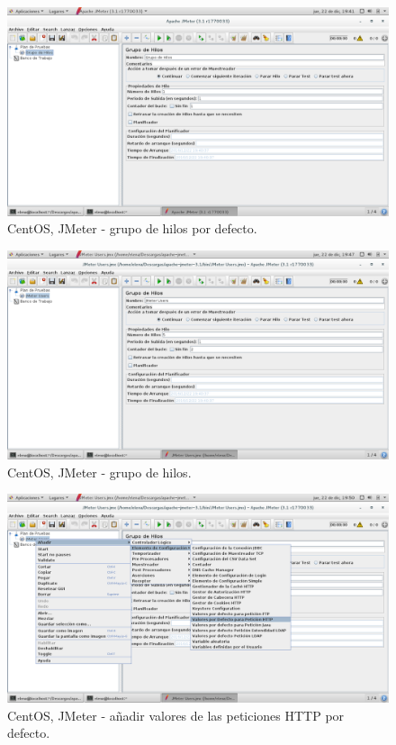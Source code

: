 \begin{figure}[H] 
	\centering
	\includegraphics[width=14.7cm]{./img/ejercicio4_2.png} 	
	\caption{CentOS, JMeter - grupo de hilos por defecto.} \label{fig:ejercicio4_2}
\end{figure}

\begin{figure}[H] 
	\centering
	\includegraphics[width=14.7cm]{./img/ejercicio4_3.png} 	
	\caption{CentOS, JMeter - grupo de hilos.} \label{fig:ejercicio4_3}
\end{figure}

\begin{figure}[H] 
	\centering
	\includegraphics[width=14.7cm]{./img/ejercicio4_4.png} 	
	\caption{CentOS, JMeter - añadir valores de las peticiones HTTP por defecto.} \label{fig:ejercicio4_4}
\end{figure}

